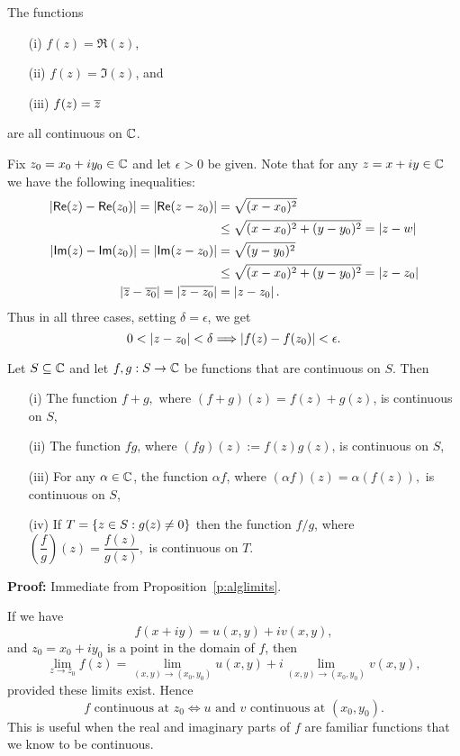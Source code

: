 \begin{example}
\label{e:cts}

The functions
\begin{enumerate}
\item[(i)] $f(z) = \Re (z)$,
\item[(ii)] $f(z) = \Im (z)$, and
\item[(iii)] $f(z) = \overline{z}$
\end{enumerate}
are all continuous on $\mathbb{C}$.
\end{example}

\begin{solution}
Fix $z_0=x_0+iy_0 \in \mathbb{C}$ and let $\epsilon>0$ be given.  Note that for any $z=x+iy \in \mathbb{C}$ we have the following inequalities:
\begin{align*}
\left|  \textsf{Re} (z) - \textsf{Re} (z_0) \right| = \left| \textsf{Re} (z-z_0) \right| & = \sqrt{(x-x_0)^2} \\
&\leq \sqrt{(x-x_0)^2+(y-y_0)^2} = \left| z-w \right| \\
\left|  \textsf{Im} (z) - \textsf{Im} (z_0) \right| = \left| \textsf{Im} (z-z_0) \right| & = \sqrt{(y-y_0)^2} \\
&\leq \sqrt{(x-x_0)^2+(y-y_0)^2} = \left| z-z_0 \right| \\
\left| \overline{z}-\overline{z_0} \right| = \left| \overline{z-z_0} \right| & = \left| z-z_0 \right|.
\end{align*}
Thus in all three cases, setting $\delta=\epsilon$, we get
\[
0< \left| z-z_0 \right| < \delta \Longrightarrow \left| f(z)-f(z_0) \right| < \epsilon.
\]
\end{solution}



\begin{proposition}
\label{t:continuity}
Let $S \subseteq \mathbb{C}$ and let $f,g:S \to \mathbb{C}$ be functions that are continuous on $S$.  Then
\begin{enumerate}
\item[(i)] The function $f+g,$ where $(f+g)(z)=f(z)+g(z)$, is continuous on $S$,
\item[(ii)] The function $fg$, where $(fg)(z):=f(z)g(z)$, is continuous on $S$,
\item[(iii)] For any $\alpha \in \mathbb{C}$, the function $\alpha f$, where $(\alpha f)(z)=\alpha \left( f(z) \right),$ is continuous on $S$,
\item[(iv)] If $T=\left\{z \in S: g(z) \neq 0 \right\}$ then the function $ f/g$, where $ \left( \dfrac{f}{g} \right) (z)= \dfrac{f(z)}{g(z)},$ is continuous on $T$.
\end{enumerate}
\end{proposition}
{\bf Proof:} Immediate from Proposition~\ref{p:alglimits}.

\begin{note}
If we have
\[
f(x+iy) = u(x,y) + i v(x,y),
\]
and $z_0 = x_0 + i y_0$ is a point in the domain of $f$, then
\[
\lim_{z \to z_0} f(z) = \lim_{(x,y) \to (x_0,y_0)} u(x,y)+ i \lim_{(x,y) \to (x_0,y_0)} v(x,y),
\]
provided these limits exist.  Hence
\[
f \text{ continuous at }z_0 \Leftrightarrow u \text{ and } v \text{ continuous at } (x_0,y_0).
\]
This is useful when the real and imaginary parts of $f$ are familiar functions that we know to be continuous.
\end{note}

\newpage




